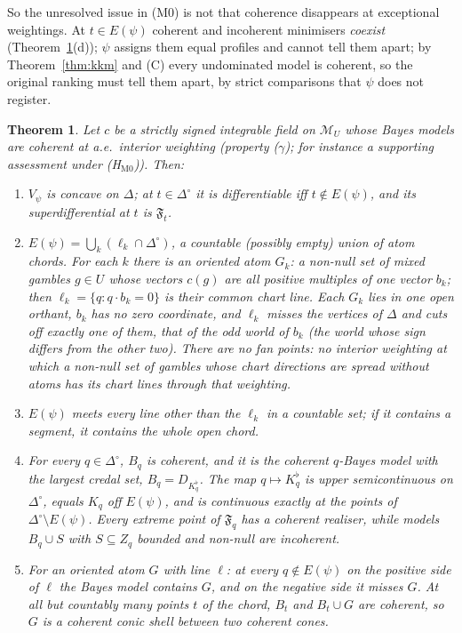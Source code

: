 \documentclass[11pt]{article}
\newtheorem{theorem}{Theorem}[section]
\theoremstyle{definition}
\theoremstyle{remark}
\newcommand{\Di}{\Delta^{\circ}}
\newcommand{\M}{\mathcal M}
\begin{document}
So the unresolved issue in (M0) is not that coherence disappears at exceptional weightings. At $t\in E(\psi)$ coherent and incoherent minimisers \emph{coexist} (Theorem~\ref{thm:Estructure}(d)); $\psi$ assigns them equal profiles and cannot tell them apart; by Theorem~\ref{thm:kkm} and (C) every undominated model is coherent, so the original ranking must tell them apart, by strict comparisons that $\psi$ does not register.

\begin{theorem}\label{thm:Estructure}
Let $c$ be a strictly signed integrable field on $\M_U$ whose Bayes models are coherent at a.e.\ interior weighting (property ($\gamma$); for instance a supporting assessment under (H$_{\mathrm{M0}}$)). Then:
\begin{enumerate}[leftmargin=*,label=(\alph*)]
\item $V_\psi$ is concave on $\Delta$; at $t\in\Di$ it is differentiable iff $t\notin E(\psi)$, and its superdifferential at $t$ is $\mathfrak F_t$.
\item $E(\psi)=\bigcup_k(\ell_k\cap\Di)$, a countable (possibly empty) union of \emph{atom chords}. For each $k$ there is an \emph{oriented atom} $G_k$: a non-null set of mixed gambles $g\in U$ whose vectors $c(g)$ are all positive multiples of one vector $b_k$; then $\ell_k=\{q:q\cdot b_k=0\}$ is their common chart line. Each $G_k$ lies in one open orthant, $b_k$ has no zero coordinate, and $\ell_k$ misses the vertices of $\Delta$ and cuts off exactly one of them, that of the \emph{odd world} of $b_k$ (the world whose sign differs from the other two). There are no \emph{fan points}: no interior weighting at which a non-null set of gambles whose chart directions are spread without atoms has its chart lines through that weighting.
\item $E(\psi)$ meets every line other than the $\ell_k$ in a countable set; if it contains a segment, it contains the whole open chord.
\item For every $q\in\Di$, $B_q$ is coherent, and it is the coherent $q$-Bayes model with the largest credal set, $B_q=D_{K^\flat_q}$. The map $q\mapsto K^\flat_q$ is upper semicontinuous on $\Di$, equals $K_q$ off $E(\psi)$, and is continuous exactly at the points of $\Di\setminus E(\psi)$. Every extreme point of $\mathfrak F_q$ has a coherent realiser, while models $B_q\cup S$ with $S\subseteq Z_q$ bounded and non-null are incoherent.
\item For an oriented atom $G$ with line $\ell$: at every $q\notin E(\psi)$ on the positive side of $\ell$ the Bayes model contains $G$, and on the negative side it misses $G$. At all but countably many points $t$ of the chord, $B_t$ and $B_t\cup G$ are coherent, so $G$ is a coherent conic shell between two coherent cones.
\end{enumerate}
\end{theorem}
\end{document}
